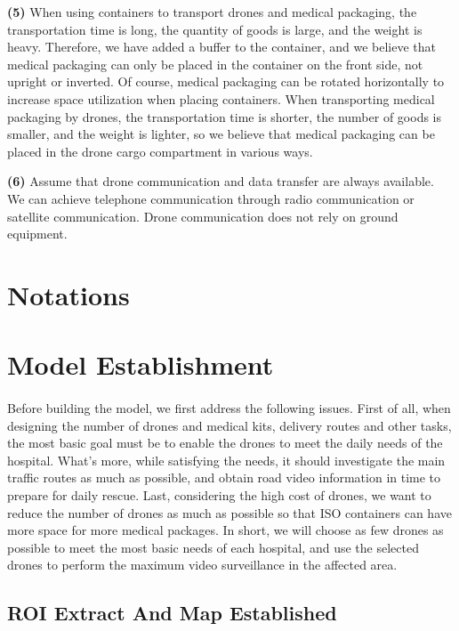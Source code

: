 \documentclass{article} %
\begin{document}
\textbf{(5)} When using containers to transport drones and medical packaging, the transportation time is long, the quantity of goods is large, and the weight is heavy. Therefore, we have added a buffer to the container, and we believe that medical packaging can only be placed in the container on the front side, not upright or inverted. Of course, medical packaging can be rotated horizontally to increase space utilization when placing containers. When transporting medical packaging by drones, the transportation time is shorter, the number of goods is smaller, and the weight is lighter, so we believe that medical packaging can be placed in the drone cargo compartment in various ways.


\textbf{(6)} Assume that drone communication and data transfer are always available. We can achieve telephone communication through radio communication or satellite communication. Drone communication does not rely on ground equipment.

\section{Notations}

\section{Model Establishment}
\paragraph{}Before building the model, we first address the following issues.
First of all, when designing the number of drones and medical kits, delivery routes and other tasks, the most basic goal must be to enable the drones to meet the daily needs of the hospital. What’s more, while satisfying the needs, it should investigate the main traffic routes as much as possible, and obtain road video information in time to prepare for daily rescue.
Last, considering the high cost of drones, we want to reduce the number of drones as much as possible so that ISO containers can have more space for more medical packages.
In short, we will choose as few drones as possible to meet the most basic needs of each hospital, and use the selected drones to perform the maximum video surveillance in the affected area.
\subsection{ROI Extract And Map Established}
\end{document}
